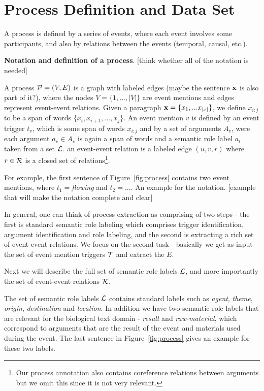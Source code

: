 \section{Process Definition and Data Set}

A process is defined by a series of events, where each event involves some participants, and also by relations between the events (temporal, causal, etc.). 

\textbf{Notation and definition of a process}. [think whether all of the notation is needed]

A process $\mathcal{P}=(V,E)$ is a graph with labeled edges (maybe the sentence $\mathbf{x}$ is also part of it?), where the nodes $V=\{1,...,|V|\}$ are event mentions and edges represent event-event relations. Given a paragraph $\mathbf{x}=\{x_1,...x_{|x|}\}$, we define $x_{i:j}$ to be a span of words $\{x_i,x_{i+1},...,x_j\}$. An event mention $v$ is defined by an event trigger $t_v$, which is some span of words $x_{i:j}$ and by a set of arguments $A_v$, were each argument $a_v \in A_v$ is again a span of words and a semantic role label $a_l$ taken from a set $\mathcal{L}$. an event-event relation is a labeled edge $(u,v,r)$ where $r \in \mathcal{R}$ is a closed set of relations\footnote{Our process annotation also contains coreference relations between arguments but we omit this since it is not very relevant.}.

For example, the first sentence of Figure~\ref{fig:process} contains two event mentions, where $t_1=$\emph{flowing} and $t_2=$.... An example for the notation. [example that will make the notation complete and clear]

In general, one can think of process extraction as comprising of two steps - the first is standard semantic role labeling which comprises trigger identification, argument identification and role labeling, and the second is extracting a rich set of event-event relations. We focus on the second task - basically we get as input the set of event mention triggers $\mathcal{T}$ and extract the $E$.

Next we will describe the full set of semantic role labels $\mathcal{L}$, and more importantly the set of event-event relations $\mathcal{R}$.

The set of semantic role labels $\mathcal{L}$ contains standard labels such as \emph{agent}, \emph{theme}, \emph{origin}, \emph{destination} and \emph{location}. In addition we have two semantic role labels that are relevant for the biological text domain - \emph{result} and \emph{raw-material}, which correspond to arguments that are the result of the event and materials used during the event. The last sentence in Figure~\ref{fig:process} gives an example for these two labels.

